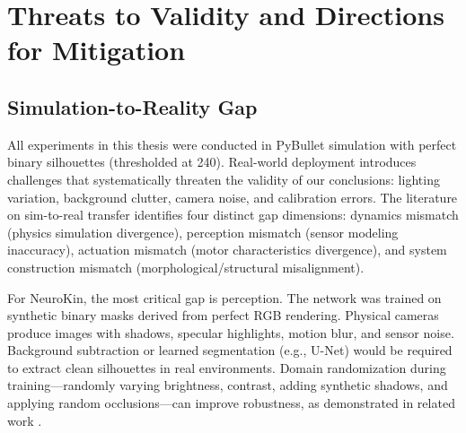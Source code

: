 \documentclass[12pt,a4paper,oneside]{report}
\begin{document}
\section{Threats to Validity and Directions for Mitigation}

\subsection{Simulation-to-Reality Gap}
\label{subsec:simulation_to_reality_gap}

All experiments in this thesis were conducted in PyBullet simulation with perfect binary silhouettes (thresholded at 240). Real-world deployment introduces challenges that systematically threaten the validity of our conclusions: lighting variation, background clutter, camera noise, and calibration errors. The literature on sim-to-real transfer \cite{tan2018simtoreal, aljalbout2026realitygap} identifies four distinct gap dimensions: dynamics mismatch (physics simulation divergence), perception mismatch (sensor modeling inaccuracy), actuation mismatch (motor characteristics divergence), and system construction mismatch (morphological/structural misalignment).

For NeuroKin, the most critical gap is perception. The network was trained on synthetic binary masks derived from perfect RGB rendering. Physical cameras produce images with shadows, specular highlights, motion blur, and sensor noise. Background subtraction or learned segmentation (e.g., U-Net) would be required to extract clean silhouettes in real environments. Domain randomization during training—randomly varying brightness, contrast, adding synthetic shadows, and applying random occlusions—can improve robustness, as demonstrated in related work \cite{rezvani2024robust, qiu2024swim2real}.
\end{document}
